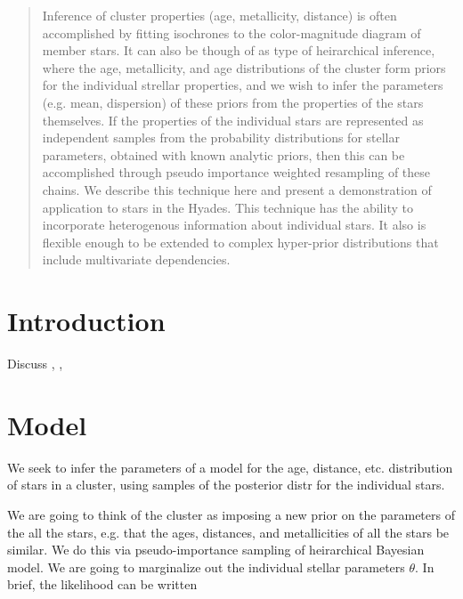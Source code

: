 \documentclass[manuscript, letterpaper]{aastex6}
\begin{document}
\author{B. Johnson}


\begin{abstract}
Inference of cluster properties (age, metallicity, distance) is often
 accomplished by fitting isochrones to the color-magnitude diagram of member
 stars.
It can also be though of as type of heirarchical inference, where the age,
 metallicity, and age distributions of the cluster form priors for the
 individual strellar properties, and we wish to infer the parameters (e.g. mean,
 dispersion) of these priors from the properties of the stars themselves.
If the properties of the individual stars are represented as independent samples from the
 probability distributions for stellar parameters, obtained with known
 analytic priors, then this can be accomplished through pseudo importance
 weighted resampling of these chains.
We describe this technique here and present a demonstration of application to
  stars in the Hyades.
This technique has the ability to incorporate heterogenous information about
  individual stars.
It also is flexible enough to be extended to complex hyper-prior distributions
  that include multivariate dependencies.
\end{abstract}


\section{Introduction}
Discuss \match, , \tausq 

\section{Model}
We seek to infer the parameters of a model for the age, distance, etc. distribution of stars in a cluster, using samples of the posterior distr for the individual stars.

We are going to think of the cluster as imposing a new prior on the parameters of the all the stars, 
e.g. that the ages, distances, and metallicities of all the stars be similar.
We do this via pseudo-importance sampling of heirarchical Bayesian model.
We are going to marginalize out the individual stellar parameters $\theta$.
In brief, the likelihood can be written
\end{document}
